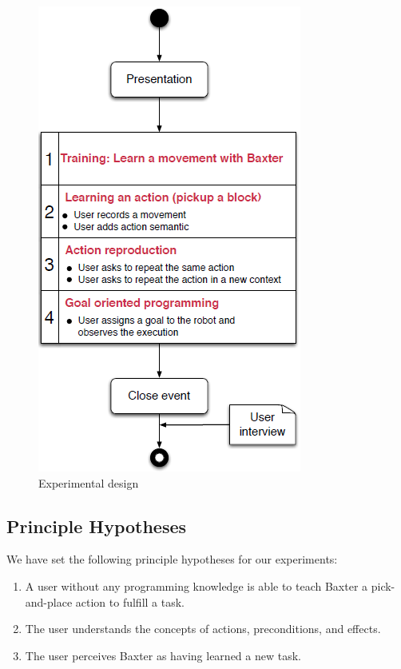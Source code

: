 \begin{figure}[h]
\begin{minipage}{.5\textwidth}
		\includegraphics[scale=0.56]{figures/protocole}
		\caption{Experimental design}
		\label{fig:Experimental design}
	\end{minipage}
\end{figure}

\subsection{Principle Hypotheses}
We have set the following principle hypotheses for our experiments:
\begin{enumerate}
	\item A user without any programming knowledge is able to teach Baxter a pick-and-place action to fulfill a task.
	\item The user understands the concepts of actions, preconditions, and effects.
	\item The user perceives Baxter as having learned a new task.
\end{enumerate}

